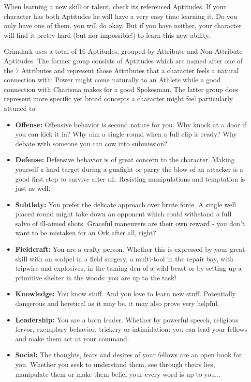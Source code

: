 When learning a new skill or talent, check its referenced Aptitudes. 
If your character has both Aptitudes he will have a very easy time learning it.
Do you only have one of them, you will do okay.
But if you have neither, your character will find it pretty hard (but nor impossible!) to learn this new ability.

Grimdark uses a total of 16 Aptitudes, grouped by Attribute and Non-Attribute Aptitudes.
The former group consists of Aptitudes which are named after one of the 7 Attributes and represent those Attributes that a character feels a natural connection with: Power might come naturally to an Athlete while a good connection with Charisma makes for a good Spokesman.
The latter group does represent more specific yet broad concepts a character might feel particularly attuned to:
\begin{itemize}
	\item \textbf{Offense:} Offensive behavior is second nature for you. Why knock at a door if you can kick it in? Why aim a single round when a full clip is ready? Why debate with someone you can cow into submission?
	\item \textbf{Defense:} Defensive behavior is of great concern to the character. Making yourself a hard target during a gunfight or parry the blow of an attacker is a good first step to survive after all. Resisting manipulations and temptation is just as well.
	\item \textbf{Subtlety:} You prefer the delicate approach over brute force. A single well placed round might take down an opponent which could withstand a full salvo of ill-aimed shots. Graceful maneuvers are their own reward - you don't want to be mistaken for an Ork after all, right?
	\item \textbf{Fieldcraft:} You are a crafty person. Whether this is expressed by your great skill with an scalpel in a field surgery, a multi-tool in the repair bay, with tripwire and explosives, in the taming den of a wild beast or by setting up a primitive shelter in the woods: you are up to the task!
	\item \textbf{Knowledge:} You know stuff. And you love to learn new stuff. Potentially dangerous and heretical as it may be, it may also prove very helpful.
	\item \textbf{Leadership:} You are a born leader. Whether by powerful speech, religious fervor, exemplary behavior, trickery or intimidation: you can lead your fellows and make them act at your command.
	\item \textbf{Social:} The thoughts, fears and desires of your fellows are an open book for you. Whether you seek to understand them, see through theirs lies, manipulate them or make them belief your every word is up to you...

\end{itemize}
